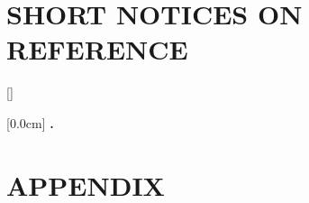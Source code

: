 \documentclass[a4paper,13pt,3p,twoside]{report}
\theoremstyle{definition}
\begin{document}
\newpage
\chapter*{SHORT NOTICES ON REFERENCE} %
\label{chapter:reference}


\newpage
\renewcommand\bibname{REFERENCE}
\printbibliography
{}

\appendixpage
\appendix
\addappheadtotoc

[]
\titlespacing*{\chapter}{0pt}{-20pt}{20pt}

    [0.0cm]             %
    {\bfseries\vspace{0.3cm}}                  %
    {{\bfseries{\scshape} \thecontentslabel.\ }} %
    {}         %
    {\contentspage} 
    
\chapter{APPENDIX}


% 

% 
\end{document}
